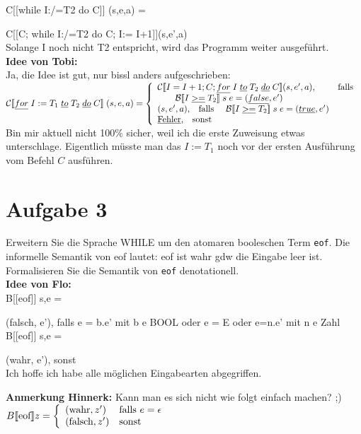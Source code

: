 \documentclass[ngerman,a4paper]{report}
\begin{document}
C[[while I:/=T2 do C]] (s,e,a) = { C[[C; while I:/=T2 do C; I:= I+1]](s,e',a)\\

Solange I noch nicht T2 entspricht, wird das Programm weiter ausgeführt.\\

\textbf{Idee von Tobi:}\\
Ja, die Idee ist gut, nur bissl anders aufgeschrieben:\\
$		\mathcal{C}
[\![\underline{for}\;I:=T_1\;\underline{to}\;T_2\;\underline{do}\;C]\!]\;(s,e,a) = \left\lbrace\begin{array}{l l} \mathcal{C}
[\![I=I+1;C;\underline{for}\;I\;\underline{to}\;T_2\;\underline{do}\;C]\!](s,e',a)\text{,}&\text{falls }\\\quad\quad\mathcal{B}
[\![I\;\underline{>=}\;T_2]\!]\;s\;e= (\underline{false},e')\\
(s,e',a)\text{,}\quad\text{falls }\quad\mathcal{B}[\![I\;\underline{>=}\;T_2]\!]\;s\;e= (\underline{true},e')\\
		\underline{\text{Fehler}}\text{,}\quad\text{sonst} \end{array}\right.$\\
Bin mir aktuell nicht 100\% sicher, weil ich die erste Zuweisung etwas unterschlage. Eigentlich müsste man das $I:=T_1$ noch vor der ersten Ausführung vom Befehl $C$ ausführen.\\

\section*{Aufgabe 3}
Erweitern Sie die Sprache WHILE um den atomaren booleschen Term \lstinline!eof!. Die informelle Semantik von eof lautet: eof ist wahr gdw die Eingabe leer ist.\\
Formalisieren Sie die Semantik von \lstinline!eof! denotationell.\\

\textbf{Idee von Flo:}\\

B[[eof]] s,e = { (falsch, e'), falls e = b.e' mit b e BOOL oder e = E oder e=n.e' mit n e Zahl\\
B[[eof]] s,e = { (wahr, e'), sonst\\

Ich hoffe ich habe alle möglichen Eingabearten abgegriffen.

\textbf{Anmerkung Hinnerk:} Kann man es sich nicht wie folgt einfach machen? ;)\\
$ B \llbracket\text{eof} \rrbracket z = \left\lbrace\begin{array}{l l}
(\text{wahr},z') & \text{falls } e = \epsilon\\
(\text{falsch},z') & \text{sonst}
\end{array}\right.$
}}}
\end{document}
